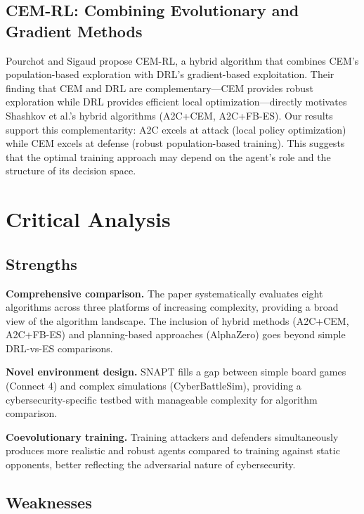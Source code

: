 \documentclass[conference, 10pt]{IEEEtran}
\begin{document}
\subsection{CEM-RL: Combining Evolutionary and Gradient Methods}

Pourchot and Sigaud \cite{pourchot2018} propose CEM-RL, a hybrid algorithm that combines CEM's population-based exploration with DRL's gradient-based exploitation. Their finding that CEM and DRL are complementary---CEM provides robust exploration while DRL provides efficient local optimization---directly motivates Shashkov et al.'s hybrid algorithms (A2C+CEM, A2C+FB-ES). Our results support this complementarity: A2C excels at attack (local policy optimization) while CEM excels at defense (robust population-based training). This suggests that the optimal training approach may depend on the agent's role and the structure of its decision space.

\section{Critical Analysis}

\subsection{Strengths}

\textbf{Comprehensive comparison.} The paper systematically evaluates eight algorithms across three platforms of increasing complexity, providing a broad view of the algorithm landscape. The inclusion of hybrid methods (A2C+CEM, A2C+FB-ES) and planning-based approaches (AlphaZero) goes beyond simple DRL-vs-ES comparisons.

\textbf{Novel environment design.} SNAPT fills a gap between simple board games (Connect 4) and complex simulations (CyberBattleSim), providing a cybersecurity-specific testbed with manageable complexity for algorithm comparison.

\textbf{Coevolutionary training.} Training attackers and defenders simultaneously produces more realistic and robust agents compared to training against static opponents, better reflecting the adversarial nature of cybersecurity.

\subsection{Weaknesses}
\end{document}
